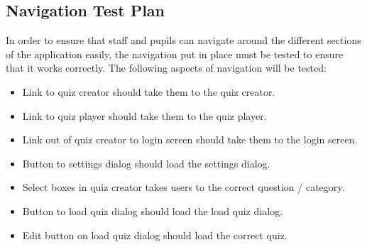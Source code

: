 \subsection{Navigation Test Plan}
In order to ensure that staff and pupils can navigate around the different sections of the application easily, the navigation put in place must be tested to ensure that it works correctly. The following aspects of navigation will be tested:

\begin{itemize}
\item Link to quiz creator should take them to the quiz creator.
\item Link to quiz player should take them to the quiz player.
\item Link out of quiz creator to login screen should take them to the login screen.
\item Button to settings dialog should load the settings dialog.
\item Select boxes in quiz creator takes users to the correct question / category.
\item Button to load quiz dialog should load the load quiz dialog.
\item Edit button on load quiz dialog should load the correct quiz.
\end{itemize}
